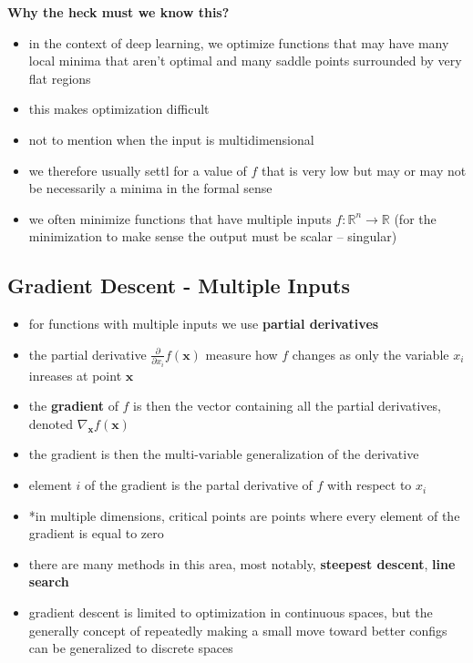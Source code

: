 \documentclass[11pt, twocolumn]{report}
\def\realnumbers{\mathbb{R}}
\begin{document}
\textbf{Why the heck must we know this?}
\begin{itemize}
  \item in the context of deep learning, we optimize functions that may have
    many local minima that aren't optimal and many saddle points surrounded by
    very flat regions
  \item this makes optimization difficult
  \item not to mention when the input is multidimensional
  \item we therefore usually settl for a value of $f$ that is very low but may
    or may not be necessarily a minima in the formal sense
  \item we often minimize functions that have multiple inputs $f :
    \realnumbers^n \to \realnumbers$ (for the minimization to make sense the
    output must be scalar -- singular)
\end{itemize}

\subsection{Gradient Descent - Multiple Inputs}
\begin{itemize}
  \item for functions with multiple inputs we use \textbf{partial derivatives}
  \item the partial derivative $\frac{\partial}{\partial x_i} f(\bm{x})$
    measure how $f$ changes as only the variable $x_i$ inreases at point
    $\bm{x}$
  \item the \textbf{gradient} of $f$ is then the vector containing all the
    partial derivatives, denoted $\nabla_{\bm{x}} f(\bm{x})$
  \item the gradient is then the multi-variable generalization of the derivative
  \item element $i$ of the gradient is the partal derivative of $f$ with
    respect to $x_i$
  \item *in multiple dimensions, critical points are points where every element
    of the gradient is equal to zero
  \item there are many methods in this area, most notably, \textbf{steepest
      descent}, \textbf{line search}
  \item gradient descent is limited to optimization in continuous
    spaces, but the generally concept of repeatedly making a small move toward
    better configs can be generalized to discrete spaces
\end{itemize}
\end{document}
